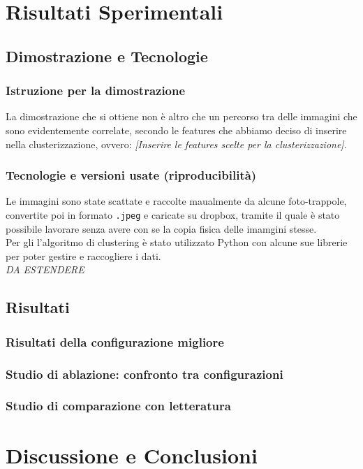 \documentclass[12pt,a4paper,twoside]{article}
\begin{document}
\newpage
\section{Risultati Sperimentali}

\subsection{Dimostrazione e Tecnologie}
\subsubsection*{Istruzione per la dimostrazione}
La dimostrazione che si ottiene non è altro che un percorso tra delle immagini che sono 
evidentemente correlate, secondo le features che abbiamo deciso di inserire nella clusterizzazione, 
ovvero: \textit{[Inserire le features scelte per la clusterizzazione]}.
\subsubsection*{Tecnologie e versioni usate (riproducibilità)}
Le immagini sono state scattate e raccolte maualmente da alcune foto-trappole, convertite poi in 
formato \texttt{.jpeg} e caricate su dropbox, tramite il quale è stato possibile lavorare senza 
avere con se la copia fisica delle imamgini stesse.\\ 
Per gli l'algoritmo di clustering è stato utilizzato Python con alcune sue librerie per poter 
gestire e raccogliere i dati.\\
\textit{DA ESTENDERE} 

\subsection{Risultati}
\subsubsection*{Risultati della configurazione migliore}
\subsubsection*{Studio di ablazione: confronto tra configurazioni}
\subsubsection*{Studio di comparazione con letteratura}


\newpage
\section{Discussione e Conclusioni}
\end{document}
